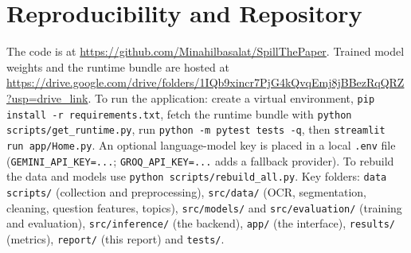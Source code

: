 \documentclass[11pt,a4paper]{article}
\newcommand{\weightsurl}{https://drive.google.com/drive/folders/1IQb9xincr7PjG4kQvqEmj8jBBezRqQRZ?usp=drive_link}
\begin{document}
\section{Reproducibility and Repository}
\label{sec:repro}
The code is at \url{https://github.com/Minahilbasalat/SpillThePaper}. Trained model weights and the runtime bundle are hosted
at \url{\weightsurl}. To run the application: create a virtual environment, \texttt{pip install -r requirements.txt}, fetch the
runtime bundle with \texttt{python scripts/get\_runtime.py}, run \texttt{python -m pytest tests -q}, then
\texttt{streamlit run app/Home.py}. An optional language-model key is placed in a local \texttt{.env} file
(\texttt{GEMINI\_API\_KEY=...}; \texttt{GROQ\_API\_KEY=...} adds a fallback provider). To rebuild the data and models use
\texttt{python scripts/rebuild\_all.py}. Key folders: \texttt{data scripts/} (collection and preprocessing), \texttt{src/data/}
(OCR, segmentation, cleaning, question features, topics), \texttt{src/models/} and \texttt{src/evaluation/} (training and
evaluation), \texttt{src/inference/} (the backend), \texttt{app/} (the interface), \texttt{results/} (metrics),
\texttt{report/} (this report) and \texttt{tests/}.
\end{document}
